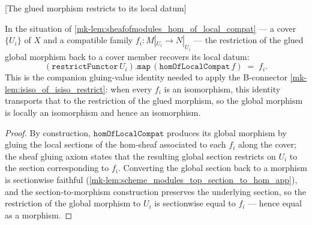 \begin{lemma}


[The glued morphism restricts to its local datum]
  \label{mk-lem:hom_of_local_compat_restrict}
  \lean{}

  In the situation of \ref{mk-lem:sheafofmodules_hom_of_local_compat} --- a cover \(\{U_i\}\)
  of \(X\) and a compatible family \(f_i : M|_{U_i} \to N|_{U_i}\) --- the restriction of the
  glued global morphism back to a cover member recovers its local datum:
  \[
    (\mathtt{restrictFunctor}\,U_i).\mathtt{map}\,(\mathtt{homOfLocalCompat}\,f) \;=\; f_i .
  \]
  This is the companion gluing-value identity needed to apply the B-connector
  \ref{mk-lem:isiso_of_isiso_restrict}: when every \(f_i\) is an isomorphism, this identity
  transports that to the restriction of the glued morphism, so the global morphism is
  locally an isomorphism and hence an isomorphism.
\end{lemma}
\begin{proof}


  By construction, \(\mathtt{homOfLocalCompat}\) produces its global morphism by gluing
  the local sections of the hom-sheaf associated to each \(f_i\) along the cover; the sheaf
  gluing axiom states that the resulting global section restricts on \(U_i\) to the section
  corresponding to \(f_i\). Converting the global section back to a morphism is sectionwise
  faithful (\ref{mk-lem:scheme_modules_top_section_to_hom_app}), and the section-to-morphism
  construction preserves the underlying section, so the restriction of the global morphism to
  \(U_i\) is sectionwise equal to \(f_i\) --- hence equal as a morphism.
\end{proof}

